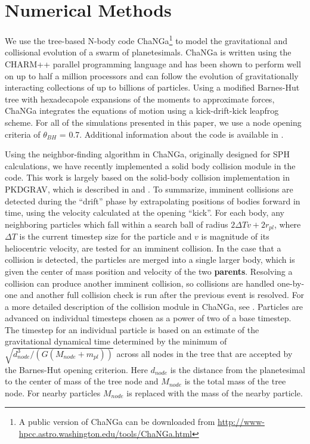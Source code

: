 \documentclass[twocolumn,linenumbers]{aastex63}
\begin{document}
\section{Numerical Methods}\label{sec:methods}

We use the tree-based N-body code {\sc ChaNGa}\footnote{A public version of {\sc ChaNGa} can be downloaded from \url{http://www-hpcc.astro.washington.edu/tools/ChaNGa.html}} to model the gravitational and collisional evolution of a swarm of planetesimals. {\sc ChaNGa} is written using the {\sc CHARM++} parallel programming language and has been shown to perform well on up to half a million processors \citep{menon15} and can follow the evolution of gravitationally interacting collections of up to billions of particles. Using a modified Barnes-Hut tree with hexadecapole expansions of the moments to approximate forces, {\sc ChaNGa} integrates the equations of motion using a kick-drift-kick leapfrog scheme. For all of the simulations presented in this paper, we use a node opening criteria of $\theta_{BH}$ = 0.7. Additional information about the code is available in \citep{jetley08,menon15}.

Using the neighbor-finding algorithm in {\sc ChaNGa}, originally
designed for SPH calculations, we have recently implemented a solid
body collision module in the code.  This work is largely based on the
solid-body collision implementation in {\sc PKDGRAV}, which is
described in \citet{richardson94} and \citet{richardson00}. To
summarize, imminent collisions are detected during the ``drift'' phase
by extrapolating positions of bodies forward in time, using the
velocity calculated at the opening ``kick''. For each body, any
neighboring particles which fall within a search ball of radius
$2 \Delta T v + 2 r_{pl}$, where $\Delta T$ is the current timestep size
for the particle and $v$ is magnitude of its heliocentric velocity,
 are tested for an imminent collision. In the case that
a collision is detected, the particles are merged into a single larger
body, which is given the center of mass position and velocity of the
two \textbf{parents}. Resolving a collision can produce another imminent
collision, so collisions are handled one-by-one and another full
collision check is run after the previous event is resolved. For a
more detailed description of the collision module in {\sc ChaNGa}, see
\citep{wallace19}.
Particles are advanced on individual timesteps chosen as a
power of two of a base timestep.  The timestep for an individual
particle is based on an estimate of the gravitational dynamical time
determined by the minimum of $\sqrt{d_{node}^3/(G(M_{node} + m_{pl}))}$
across all nodes in the tree that are accepted by the Barnes-Hut
opening criterion.  Here $d_{node}$ is the distance from the
planetesimal to the center of mass of the tree node and $M_{node}$ is
the total mass of the tree node.  For nearby particles $M_{node}$ is
replaced with the mass of the nearby particle.
\end{document}
